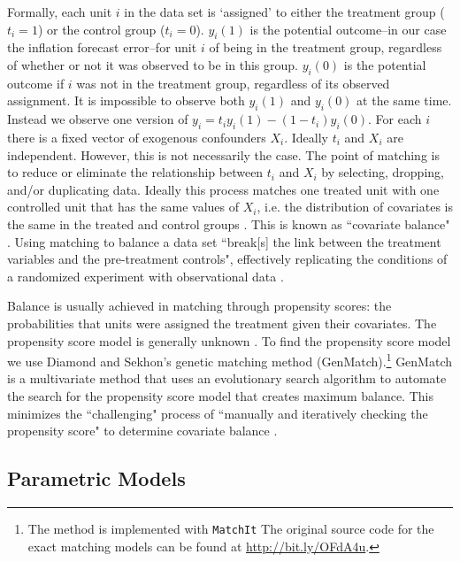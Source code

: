 \documentclass[a4paper]{article}\usepackage{graphicx, color}
\begin{document}
Formally, each unit $i$ in the data set is `assigned' to either the treatment group ($t_{i} = 1$) or the control group ($t_{i} = 0$). $y_{i}(1)$ is the potential outcome--in our case the inflation forecast error--for unit $i$ of being in the treatment group, regardless of whether or not it was observed to be in this group. $y_{i}(0)$ is the potential outcome if $i$ was not in the treatment group, regardless of its observed assignment. It is impossible to observe both $y_{i}(1)$ and $y_{i}(0)$ at the same time. Instead we observe one version of $y_{i}=t_{i}y_{i}(1)-(1-t_{i})y_i(0)$. For each $i$ there is a fixed vector of exogenous confounders $X_{i}$. Ideally $t_{i}$ and $X_{i}$ are independent. However, this is not necessarily the case. The point of matching is to reduce or eliminate the relationship between $t_{i}$  and $X_{i}$ by selecting, dropping, and/or duplicating data. Ideally this process matches one treated unit with one controlled unit that has the same values of $X_{i}$, i.e. the distribution of covariates is the same in the treated and control groups \citep{matchit2011}. This is known as ``covariate balance" \cite[1]{Diamond2012}. Using matching to balance a data set ``break[s] the link between the treatment variables and the pre-treatment controls", effectively replicating the conditions of a randomized experiment with observational data \cite[][2--3]{matchit2011}. 

Balance is usually achieved in matching through propensity scores: the probabilities that units were assigned the treatment given their covariates. The propensity score model is generally unknown \citep{Drake1993}. To find the propensity score model we use Diamond and Sekhon's \citeyearpar{Diamond2012} genetic matching method (GenMatch).\footnote{The method is implemented with {\tt{MatchIt}} The original source code for the exact matching models can be found at {\url{http://bit.ly/OFdA4u}}.} GenMatch is a multivariate method that uses an evolutionary search algorithm to automate the search for the propensity score model that creates maximum balance. This minimizes the ``challenging" process of ``manually and iteratively checking the propensity score" to determine covariate balance \citep[][2]{Diamond2012}. 


\subsection{Parametric Models}
\end{document}
